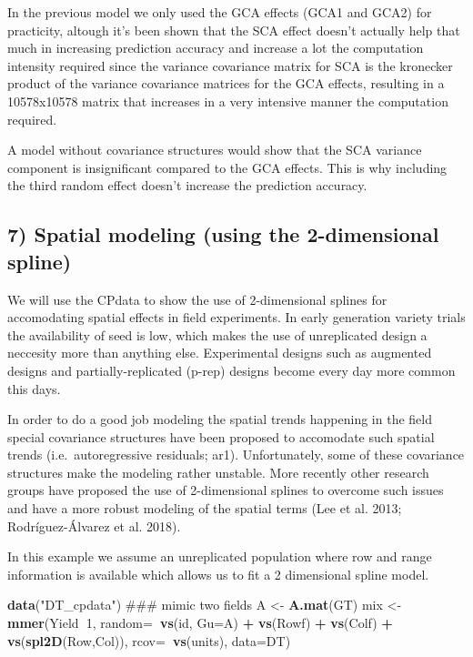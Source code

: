 \documentclass[]{article}
\newenvironment{Shaded}{\begin{snugshade}}{\end{snugshade}}
\newcommand{\KeywordTok}[1]{\textcolor[rgb]{0.13,0.29,0.53}{\textbf{#1}}}
\newcommand{\DataTypeTok}[1]{\textcolor[rgb]{0.13,0.29,0.53}{#1}}
\newcommand{\DecValTok}[1]{\textcolor[rgb]{0.00,0.00,0.81}{#1}}
\newcommand{\StringTok}[1]{\textcolor[rgb]{0.31,0.60,0.02}{#1}}
\newcommand{\OperatorTok}[1]{\textcolor[rgb]{0.81,0.36,0.00}{\textbf{#1}}}
\newcommand{\NormalTok}[1]{#1}
\begin{document}
In the previous model we only used the GCA effects (GCA1 and GCA2) for
practicity, altough it's been shown that the SCA effect doesn't actually
help that much in increasing prediction accuracy and increase a lot the
computation intensity required since the variance covariance matrix for
SCA is the kronecker product of the variance covariance matrices for the
GCA effects, resulting in a 10578x10578 matrix that increases in a very
intensive manner the computation required.

A model without covariance structures would show that the SCA variance
component is insignificant compared to the GCA effects. This is why
including the third random effect doesn't increase the prediction
accuracy.

\subsection{7) Spatial modeling (using the 2-dimensional
spline)}\label{spatial-modeling-using-the-2-dimensional-spline}

We will use the CPdata to show the use of 2-dimensional splines for
accomodating spatial effects in field experiments. In early generation
variety trials the availability of seed is low, which makes the use of
unreplicated design a neccesity more than anything else. Experimental
designs such as augmented designs and partially-replicated (p-rep)
designs become every day more common this days.

In order to do a good job modeling the spatial trends happening in the
field special covariance structures have been proposed to accomodate
such spatial trends (i.e.~autoregressive residuals; ar1). Unfortunately,
some of these covariance structures make the modeling rather unstable.
More recently other research groups have proposed the use of
2-dimensional splines to overcome such issues and have a more robust
modeling of the spatial terms (Lee et al. 2013; Rodríguez-Álvarez et al.
2018).

In this example we assume an unreplicated population where row and range
information is available which allows us to fit a 2 dimensional spline
model.

\begin{Shaded}
\begin{Highlighting}[]
\KeywordTok{data}\NormalTok{(}\StringTok{"DT_cpdata"}\NormalTok{)}
\NormalTok{### mimic two fields}
\NormalTok{A <-}\StringTok{ }\KeywordTok{A.mat}\NormalTok{(GT)}
\NormalTok{mix <-}\StringTok{ }\KeywordTok{mmer}\NormalTok{(Yield}\OperatorTok{~}\DecValTok{1}\NormalTok{,}
            \DataTypeTok{random=}\OperatorTok{~}\KeywordTok{vs}\NormalTok{(id, }\DataTypeTok{Gu=}\NormalTok{A) }\OperatorTok{+}
\StringTok{              }\KeywordTok{vs}\NormalTok{(Rowf) }\OperatorTok{+}
\StringTok{              }\KeywordTok{vs}\NormalTok{(Colf) }\OperatorTok{+}
\StringTok{              }\KeywordTok{vs}\NormalTok{(}\KeywordTok{spl2D}\NormalTok{(Row,Col)),}
            \DataTypeTok{rcov=}\OperatorTok{~}\KeywordTok{vs}\NormalTok{(units),}
            \DataTypeTok{data=}\NormalTok{DT)}
\end{Highlighting}
\end{Shaded}
\end{document}
